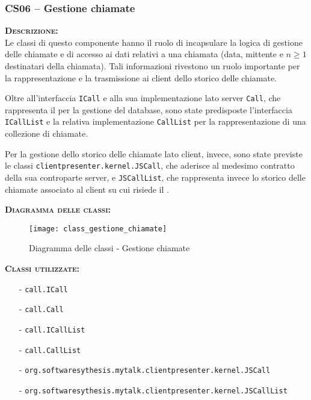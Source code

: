 \subsubsection{CS06 -- Gestione chiamate}
\begin{description}
  \item{\scshape\bfseries Descrizione:}\\
Le classi di questo componente hanno il ruolo di incapsulare la logica di gestione delle chiamate e di accesso ai dati relativi a una chiamata (data, mittente e $n\geq1$ destinatari della chiamata). Tali informazioni rivestono un ruolo importante per la rappresentazione e la trasmissione ai client dello storico delle chiamate.

Oltre all'interfaccia \texttt{ICall} e alla sua implementazione lato server \texttt{Call}, che rappresenta il  per la gestione del database, sono state predisposte l'interfaccia \texttt{ICallList} e la relativa implementazione \texttt{CallList} per la rappresentazione di una collezione di chiamate.

Per la gestione dello storico delle chiamate lato client, invece, sono state previste le classi \texttt{clientpresenter.kernel.JSCall}, che aderisce al medesimo contratto della sua controparte server, e \texttt{JSCallList}, che rappresenta invece lo storico delle chiamate associato al client su cui risiede il .

  \item{\scshape\bfseries Diagramma delle classi:}
\begin{figure}[H]
  \centering
  \texttt{[image: class\_gestione\_chiamate]}
  \caption{Diagramma delle classi - Gestione chiamate}\label{fig:gestionechiamate}
\end{figure}

  \item{\scshape\bfseries Classi utilizzate:}\\
  \begin{itemize}[noitemsep,nolistsep]
    \item[-] \texttt{call.ICall}
    \item[-] \texttt{call.Call}
    \item[-] \texttt{call.ICallList}
    \item[-] \texttt{call.CallList}
    \item[-] \texttt{org.softwaresythesis.mytalk.clientpresenter.kernel.JSCall}
    \item[-] \texttt{org.softwaresythesis.mytalk.clientpresenter.kernel.JSCallList}
  \end{itemize}
\end{description}

